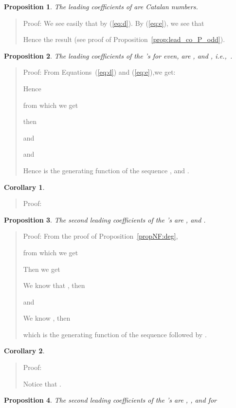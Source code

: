\documentclass[preprint,authoryear]{elsarticle}
\newenvironment{proof}[1]{\begin{quotation}\noindent\textsf{Proof:} #1}{\end{quotation}}
\newtheorem{prop}{Proposition}
\newtheorem{corollary}{Corollary}
\newcommand{\ie}{i.e.,~}
\begin{document}
 
 \begin{prop}
    The leading coefficients of  are Catalan numbers.
  \end{prop}
  \begin{proof}{}
    We see easily that  by (\ref{eq:d}).  By (\ref{eq:e}), we see
    that
    
    Hence the result  (see proof of
    Proposition~\ref{prop:lead_co_P_odd}).
  \end{proof}
  \begin{prop}\label{prop:Fev}
    The leading coefficients of the 's for  even, are ,  and , 
    \ie .
  \end{prop}
  \begin{proof}{}
    From Equations~(\ref{eq:d}) and (\ref{eq:e}),we get:
    
Hence

from which we get 

then

and

and

Hence  is the generating function of the sequence ,  and
.
  \end{proof}
  \begin{corollary}
    
  \end{corollary}
  \begin{proof}{} 
    
  \end{proof}
 \begin{prop}
The second leading coefficients of  the 's are ,  and
.
\end{prop}
\begin{proof}{}
From the proof of Proposition~\ref{propNF:deg},

from which we get

Then we get

We know that , then

and

We know , then

which is the generating function of the sequence  followed by  .
\end{proof}
\begin{corollary}
  
\end{corollary}
\begin{proof}{}
  
Notice that .
\end{proof}
\begin{prop}
  The second leading coefficients of  the 's are , ,
   and for 

\end{prop}
\end{document}
